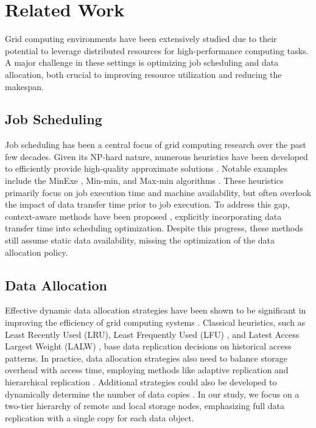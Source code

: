 \section{Related Work}
Grid computing environments have been extensively studied due to their potential to leverage distributed resources for high-performance computing tasks. A major challenge in these settings is optimizing job scheduling and data allocation, both crucial to improving resource utilization and reducing the makespan.

\subsection{Job Scheduling}
Job scheduling has been a central focus of grid computing research over the past few decades. Given its NP-hard nature, numerous heuristics have been developed to efficiently provide high-quality approximate solutions \citep{BRAUN2001810}. Notable examples include the MinExe \citep{ranganathan2002decoupling}, Min-min, and Max-min algorithms \citep{armstrong1998mapping, freund1998scheduling}.  These heuristics primarily focus on job execution time and machine availability, but often overlook the impact of data transfer time prior to job execution. To address this gap, context-aware methods have been proposed \citep{mcclatchey2007data, LI2016119, sahni2019data}, explicitly incorporating data transfer time into scheduling optimization. Despite this progress, these methods still assume static data availability, missing the optimization of the data allocation policy.

\subsection{Data Allocation}
Effective dynamic data allocation strategies have been shown to be significant in improving the efficiency of grid computing systems \citep{ALLCOCK2002749, bell2002simulation, tang2006impact, Venugopal2004grid}. Classical heuristics, such as Least Recently Used (LRU), Least Frequently Used (LFU) \citep{podlipnig2003cache}, and Latest Access Largest Weight (LALW) \citep{Ruay2008dynamic}, base data replication decisions on historical access patterns. In practice, data allocation strategies also need to balance storage overhead with access time, employing methods like adaptive replication \citep{fadaie2012replica} and hierarchical replication \citep{shorfuzzaman2010adaptive}. Additional strategies could also be developed to dynamically determine the number of data copies \citep{ranganathan2002improve}. In our study, we focus on a two-tier hierarchy of remote and local storage nodes, emphasizing full data replication with a single copy for each data object.


